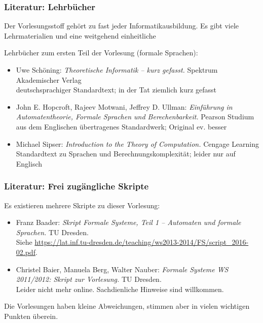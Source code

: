 \documentclass[aspectratio=1610,onlymath]{beamer}
\begin{document}

\begin{frame}\frametitle{Literatur: Lehrbücher}

Der Vorlesungsstoff gehört zu fast jeder Informatikausbildung. Es gibt viele
Lehrmaterialien und eine weitgehend einheitliche 
\bigskip

Lehrbücher zum ersten Teil der Vorlesung (formale Sprachen):

\begin{itemize}
\item Uwe Schöning: \emph{Theoretische Informatik -- kurz gefasst.} Spektrum Akademischer Verlag\\
{\footnotesize\textcolor{devilscss}{deutschsprachiger Standardtext; in der Tat ziemlich kurz gefasst}}
%
\item John E. Hopcroft, Rajeev Motwani, Jeffrey D. Ullman: \emph{Einführung in Automatentheorie, Formale Sprachen und Berechenbarkeit.} Pearson Studium\\
{\footnotesize\textcolor{devilscss}{aus dem Englischen übertragenes Standardwerk; Original ev. besser}}
%
\item Michael Sipser: \emph{Introduction to the Theory of Computation.}  Cengage Learning\\
{\footnotesize\textcolor{devilscss}{Standardtext zu Sprachen und Berechnungskomplexität; leider nur auf Englisch}}
\end{itemize}

\end{frame}

\begin{frame}\frametitle{Literatur: Frei zugängliche Skripte}

Es existieren mehrere Skripte zu dieser Vorlesung:
\begin{itemize}
\item Franz Baader: \emph{Skript Formale Systeme, Teil 1 -- Automaten und formale Sprachen.} TU Dresden.
\\{\tiny Siehe \url{https://lat.inf.tu-dresden.de/teaching/ws2013-2014/FS/script_2016-02.pdf}}.
\item Christel Baier, Manuela Berg, Walter Nauber: \emph{Formale Systeme WS 2011/2012: Skript zur Vorlesung.} TU Dresden.
\\{\tiny Leider nicht mehr online. Sachdienliche Hinweise sind willkommen.}
\end{itemize}

Die Vorlesungen haben kleine Abweichungen, stimmen aber in vielen wichtigen Punkten überein.

\end{frame}
\end{document}
